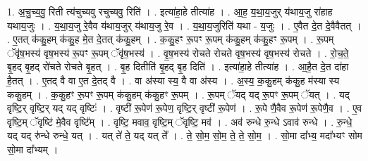 \documentclass[17pt]{extarticle}
\begin{document}
1. अ॒चु॒च्य॒वु॒ रिती त्य॑चुच्यवु रचुच्यवु॒ रिति॑ । . इत्या॑हा॒हे तीत्या॑ह । . आ॒ह॒ य॒था॒य॒जुर् य॑थाय॒जु रा॑हाह यथाय॒जुः । . य॒था॒य॒जु रे॒वैव य॑थाय॒जुर् य॑थाय॒जु रे॒व । . य॒था॒य॒जुरिति॑ यथा - य॒जुः । . ए॒वैत दे॒त दे॒वैवैतत् । . ए॒तत् क॑कु॒हम् क॑कु॒ह मे॒त दे॒तत् क॑कु॒हम् । . क॒कु॒हꣳ रू॒पꣳ रू॒पम् क॑कु॒हम् क॑कु॒हꣳ रू॒पम् । . रू॒पम् ॅवृ॑ष॒भस्य॑ वृष॒भस्य॑ रू॒पꣳ रू॒पम् ॅवृ॑ष॒भस्य॑ । . वृ॒ष॒भस्य॑ रोचते रोचते वृष॒भस्य॑ वृष॒भस्य॑ रोचते । . रो॒च॒ते॒ बृ॒हद् बृ॒हद् रो॑चते रोचते बृ॒हत् । . बृ॒ह दितीति॑ बृ॒हद् बृ॒ह दिति॑ । . इत्या॑हा॒हे तीत्या॑ह । . आ॒है॒त दे॒त दा॑हा है॒तत् । . ए॒तद् वै वा ए॒त दे॒तद् वै । . वा अ॑स्या स्य॒ वै वा अ॑स्य । . अ॒स्य॒ क॒कु॒हम् क॑कु॒ह म॑स्या स्य ककु॒हम् । . क॒कु॒हꣳ रू॒पꣳ रू॒पम् क॑कु॒हम् क॑कु॒हꣳ रू॒पम् । . रू॒पम् ॅयद् यद् रू॒पꣳ रू॒पम् ॅयत् । . यद् वृष्टि॒र् वृष्टि॒र् यद् यद् वृष्टिः॑ । . वृष्टी॑ रू॒पेण॑ रू॒पेण॒ वृष्टि॒र् वृष्टी॑ रू॒पेण॑ । . रू॒पे णै॒वैव रू॒पेण॑ रू॒पेणै॒व । . ए॒व वृष्टि॒म् ॅवृष्टि॑ मे॒वैव वृष्टि᳚म् । . वृष्टि॒ मवाव॒ वृष्टि॒म् ॅवृष्टि॒ मव॑ । . अव॑ रुन्धे रु॒न्धे ऽवाव॑ रुन्धे । . रु॒न्धे॒ यद् यद् रु॑न्धे रुन्धे॒ यत् । . यत् ते॑ ते॒ यद् यत् ते᳚ । . ते॒ सो॒म॒ सो॒म॒ ते॒ ते॒ सो॒म॒ । . सो॒मा दा᳚भ्य॒ मदा᳚भ्यꣳ सोम सो॒मा दा᳚भ्यम् । \newline
\end{document}
